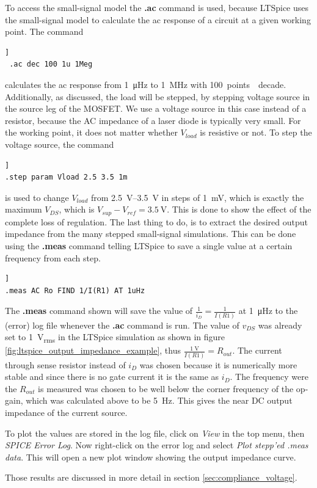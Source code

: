 \documentclass[12pt]{book}
\begin{document}
To access the small-signal model the \textbf{.ac} command is used, because LTSpice uses the small-signal model to calculate the ac response of a circuit at a given working point. The command
\begin{lstlisting}[frame=single, xleftmargin=5mm, xrightmargin=5mm, columns=fullflexible, morekeywords={model, ac, dc, options}, keywordstyle=\bfseries, basicstyle=\rmfamily]]
 .ac dec 100 1u 1Meg
\end{lstlisting}
calculates the ac response from \qty{1}{\micro\hertz} to \qty{1}{\MHz} with \qty{100}{points \per decade}.
Additionally, as discussed, the load will be stepped, by stepping voltage source in the source leg of the MOSFET. We use a voltage source in this case instead of a resistor, because the AC impedance of a laser diode is typically very small. For the working point, it does not matter whether $V_{load}$ is resistive or not. To step the voltage source, the command
\begin{lstlisting}[frame=single, xleftmargin=5mm, xrightmargin=5mm, columns=fullflexible, morekeywords={model, ac, dc, options, step}, keywordstyle=\bfseries, basicstyle=\rmfamily]]
.step param Vload 2.5 3.5 1m
\end{lstlisting}
is used to change $V_{load}$ from \qtyrange[range-units = single]{2.5}{3.5}{\V} in steps of \qty{1}{\mV}, which is exactly the maximum $V_{DS}$, which is $V_{sup} - V_{ref} = \qty{3.5}{\V}$. This is done to show the effect of the complete loss of regulation. The last thing to do, is to extract the desired output impedance from the many stepped small-signal simulations. This can be done using the \textbf{.meas} command telling LTSpice to save a single value at a certain frequency from each step.
\begin{lstlisting}[frame=single, xleftmargin=5mm, xrightmargin=5mm, columns=fullflexible, morekeywords={model, ac, dc, options, step, meas}, keywordstyle=\bfseries, basicstyle=\rmfamily]]
.meas AC Ro FIND 1/I(R1) AT 1uHz
\end{lstlisting}
The \textbf{.meas} command shown will save the value of $\frac{1}{i_{D}} = \frac{1}{I(R1)}$ at \qty{1}{\micro\hertz} to the (error) log file whenever the \textbf{.ac} command is run. The value of $v_{DS}$ was already set to \qty{1}{\V_{rms}} in the LTSpice simulation as shown in figure \ref{fig:ltspice_output_impedance_example}, thus $\frac{\qty{1}{\V}}{I(R1)} = R_{out}$. The current through sense resistor instead of $i_D$ was chosen because it is numerically more stable and since there is no gate current it is the same as $i_D$. The frequency were the $R_{out}$ is measured was chosen to be well below the corner frequency of the op-gain, which was calculated above to be \qty{5}{\Hz}. This gives the near DC output impedance of the current source.

To plot the values are stored in the log file, click on \textit{View} in the top menu, then \textit{SPICE Error Log}. Now right-click on the error log and select \textit{Plot stepp'ed .meas data}. This will open a new plot window showing the output impedance curve.

Those results are discussed in more detail in section \ref{sec:compliance_voltage}.
\end{document}
